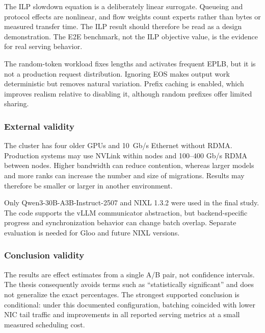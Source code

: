 The ILP slowdown equation is a deliberately linear surrogate. Queueing and
protocol effects are nonlinear, and flow weights count experts rather than
bytes or measured transfer time. The ILP result should therefore be read as a
design demonstration. The E2E benchmark, not the ILP objective value, is the
evidence for real serving behavior.

The random-token workload fixes lengths and activates frequent EPLB, but it is
not a production request distribution. Ignoring EOS makes output work
deterministic but removes natural variation. Prefix caching is enabled, which
improves realism relative to disabling it, although random prefixes offer
limited sharing.

\subsubsection{External validity}

The cluster has four older GPUs and \SI{10}{Gb/s} Ethernet without RDMA.
Production systems may use NVLink within nodes and 100--400 Gb/s RDMA between
nodes. Higher bandwidth can reduce contention, whereas larger models and more
ranks can increase the number and size of migrations. Results may therefore be
smaller or larger in another environment.

Only Qwen3-30B-A3B-Instruct-2507 and NIXL 1.3.2 were used in the final study.
The code supports the vLLM communicator abstraction, but backend-specific
progress and synchronization behavior can change batch overlap. Separate
evaluation is needed for Gloo and future NIXL versions.

\subsubsection{Conclusion validity}

The results are effect estimates from a single A/B pair, not confidence
intervals. The thesis consequently avoids terms such as ``statistically
significant'' and does not generalize the exact percentages. The strongest
supported conclusion is conditional: under this documented configuration,
batching coincided with lower NIC tail traffic and improvements in all reported
serving metrics at a small measured scheduling cost.
